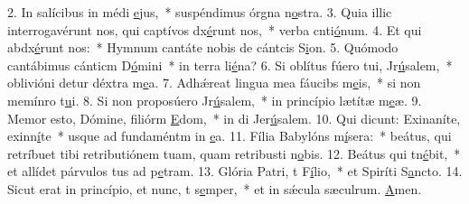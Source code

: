 2. In salícibus in médi \uline{e}jus,~* suspéndimus órgna n\uline{o}stra.
3. Quia illic interrogavérunt nos, qui captívos dx\uline{é}runt nos,~* verba cnti\uline{ó}num.
4. Et qui abdx\uline{é}runt nos:~* Hymnum cantáte nobis de cántcis S\uline{i}on.
5. Quómodo cantábimus cánticm D\uline{ó}mini~* in terra li\uline{é}na?
6. Si oblítus fúero tui, Jr\uline{ú}salem,~* oblivióni detur déxtra m\uline{e}a.
7. Adhǽreat lingua mea fáucibs m\uline{e}is,~* si non memínro t\uline{u}i.
8. Si non proposúero Jr\uline{ú}salem,~* in princípio lætítæ m\uline{e}æ.
9. Memor esto, Dómine, filiórm \uline{E}dom,~* in di Jer\uline{ú}salem.
10. Qui dicunt: Exinaníte, exinn\uline{í}te~* usque ad fundaméntm in \uline{e}a.
11. Fília Babylóns m\uline{í}sera:~* beátus, qui retríbuet tibi retributiónem tuam, quam retribusti n\uline{o}bis.
12. Beátus qui tn\uline{é}bit,~* et allídet párvulos tus ad p\uline{e}tram.
13. Glória Patri, t F\uline{í}lio,~* et Spiríti S\uline{a}ncto.
14. Sicut erat in princípio, et nunc, t s\uline{e}mper,~* et in sǽcula sæculrum. \uline{A}men.

